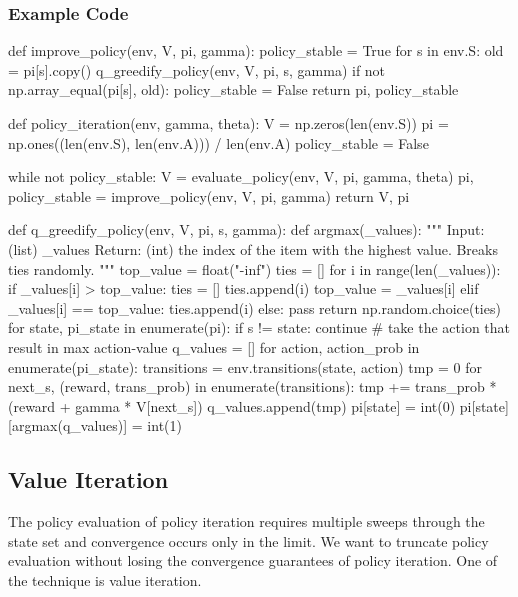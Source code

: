 \documentclass[sutton_barto_notes.tex]{subfiles}
\begin{document}
\subsubsection{Example Code}
\begin{python}
def improve_policy(env, V, pi, gamma):
    policy_stable = True
    for s in env.S:
        old = pi[s].copy()
        q_greedify_policy(env, V, pi, s, gamma)
        if not np.array_equal(pi[s], old):
            policy_stable = False
    return pi, policy_stable

def policy_iteration(env, gamma, theta):
    V = np.zeros(len(env.S))
    pi = np.ones((len(env.S), len(env.A))) / len(env.A)
    policy_stable = False
    
    while not policy_stable:
        V = evaluate_policy(env, V, pi, gamma, theta)
        pi, policy_stable = improve_policy(env, V, pi, gamma)
    return V, pi
    
def q_greedify_policy(env, V, pi, s, gamma):
    def argmax(_values):
        """
        Input:  (list) _values
        Return: (int)  the index of the item with the highest value.
        Breaks ties randomly.
        """
        top_value = float("-inf")
        ties = []
        for i in range(len(_values)):
            if _values[i] > top_value:
                ties = []
                ties.append(i)
                top_value = _values[i]
            elif _values[i] == top_value:
                ties.append(i)
            else:
                pass
        return np.random.choice(ties)
    for state, pi_state in enumerate(pi):
        if s != state:
            continue
        # take the action that result in max action-value
        q_values = []
        for action, action_prob in enumerate(pi_state):
            transitions = env.transitions(state, action)
            tmp = 0
            for next_s, (reward, trans_prob) in enumerate(transitions):
                tmp += trans_prob * (reward + gamma * V[next_s])
            q_values.append(tmp)
        pi[state] = int(0)
        pi[state][argmax(q_values)] = int(1)
\end{python}

\subsection{Value Iteration}

The policy evaluation of policy iteration requires multiple sweeps through the state set and convergence occurs only in the limit.
We want to truncate policy evaluation without losing the convergence guarantees of policy iteration. One of the technique is value iteration.
\end{document}
